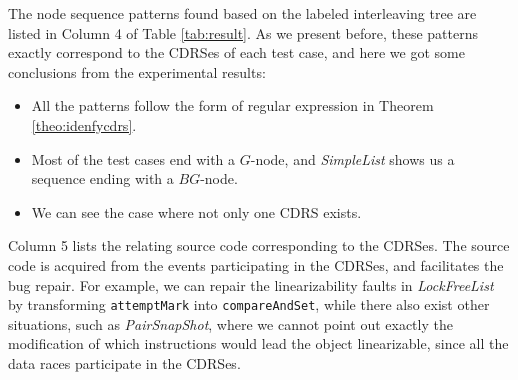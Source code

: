 \documentclass[runningheads]{llncs}
\begin{document}

The node sequence patterns found based on the labeled interleaving tree are listed in Column 4 of Table \ref{tab:result}. 
As we present before, these patterns exactly correspond to the CDRSes of each test case, and here we got some conclusions from the experimental results:
\begin{itemize}
\item All the patterns follow the form of regular expression in Theorem \ref{theo:idenfycdrs}. 
\item Most of the test cases end with a $G$-node, and \textit{SimpleList} shows us a sequence ending with a $BG$-node.
\item We can see the case where not only one CDRS exists. 
\end{itemize}

Column 5 lists the relating source code corresponding to the CDRSes. The source code is acquired from the events participating in the CDRSes, and facilitates the bug repair. For example, we can repair the linearizability faults in \textit{LockFreeList} by transforming \texttt{attemptMark} into \texttt{compareAndSet}, while there also exist other situations, such as \textit{PairSnapShot}, where we cannot point out exactly the modification of which instructions would lead the object linearizable, since all the data races participate in the CDRSes.





\end{document}

